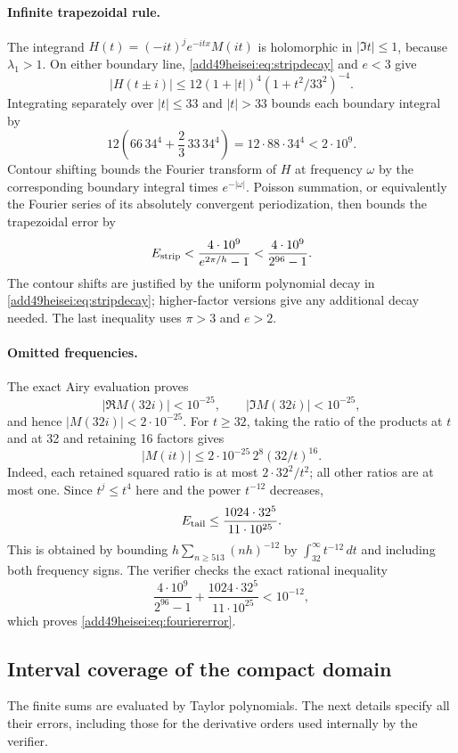 \documentclass[11pt,a4paper]{article}
\numberwithin{equation}{section}
\theoremstyle{definition}
\theoremstyle{remark}
\begin{document}
\paragraph{Infinite trapezoidal rule.}
The integrand $H(t)=(-it)^j e^{-itx}M(it)$ is holomorphic in
$|\Im t|\le1$, because $\lambda_1>1$.
On either boundary line, \eqref{add49heisei:eq:stripdecay} and $e<3$ give
\[
 |H(t\pm i)|\le12(1+|t|)^4(1+t^2/33^2)^{-4}.
\]
Integrating separately over $|t|\le33$ and $|t|>33$ bounds each boundary
integral by
\[
 12\left(66\,34^4+\frac23\,33\,34^4\right)
 =12\cdot88\cdot34^4<2\cdot10^9.
\]
Contour shifting bounds the Fourier transform of $H$ at frequency
$\omega$ by the corresponding boundary integral times $e^{-|\omega|}$.
Poisson summation, or equivalently the Fourier series of its absolutely
convergent periodization, then bounds the trapezoidal error by
\[
 E_{\rm strip}
 <\frac{4\cdot10^9}{e^{2\pi/h}-1}
 <\frac{4\cdot10^9}{2^{96}-1}.
\]
The contour shifts are justified by the uniform polynomial decay in
\eqref{add49heisei:eq:stripdecay}; higher-factor versions give any additional decay
needed. The last inequality uses $\pi>3$ and $e>2$.

\paragraph{Omitted frequencies.}
The exact Airy evaluation proves
\[
 |\Re M(32i)|<10^{-25},\qquad |\Im M(32i)|<10^{-25},
\]
and hence $|M(32i)|<2\cdot10^{-25}$.
For $t\ge32$, taking the ratio of the products at $t$ and at 32 and
retaining 16 factors gives
\[
 |M(it)|\le2\cdot10^{-25}\,2^8(32/t)^{16}.
\]
Indeed, each retained squared ratio is at most $2\cdot32^2/t^2$;
all other ratios are at most one.
Since $t^j\le t^4$ here and the power $t^{-12}$ decreases,
\[
 E_{\rm tail}
 \le\frac{1024\cdot32^5}{11\cdot10^{25}}.
\]
This is obtained by bounding
$h\sum_{n\ge513}(nh)^{-12}$ by $\int_{32}^{\infty}t^{-12}\,dt$ and
including both frequency signs. The verifier checks the exact rational
inequality
\[
 \frac{4\cdot10^9}{2^{96}-1}
 +\frac{1024\cdot32^5}{11\cdot10^{25}}<10^{-12},
\]
which proves \eqref{add49heisei:eq:fouriererror}.

\subsection{Interval coverage of the compact domain}
The finite sums are evaluated by Taylor polynomials. The next details
specify all their errors, including those for the derivative orders used
internally by the verifier.
\end{document}
